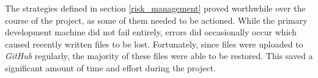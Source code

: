 
The strategies defined in section \ref{risk_management} proved worthwhile over the course of the project, as some of them needed to be actioned. While the primary development machine did not fail entirely, errors did occasionally occur which caused recently written files to be lost. Fortunately, since files were uploaded to \textit{GitHub} regularly, the majority of these files were able to be restored. This saved a significant amount of time and effort during the project.
